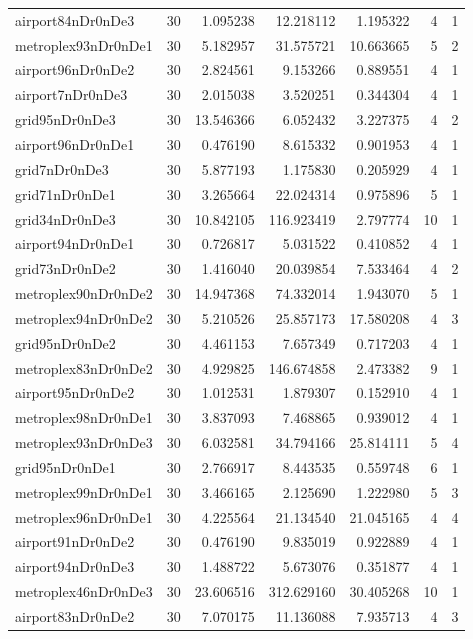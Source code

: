 \documentclass[../../../thesis.tex]{subfiles}
\begin{document}
\begin{longtable}{|l|r|r|r|r|r|r|}
airport84nDr0nDe3 & 30 & 1.095238 & 12.218112 & 1.195322 & 4 & 1 \\
metroplex93nDr0nDe1 & 30 & 5.182957 & 31.575721 & 10.663665 & 5 & 2 \\
airport96nDr0nDe2 & 30 & 2.824561 & 9.153266 & 0.889551 & 4 & 1 \\
airport7nDr0nDe3 & 30 & 2.015038 & 3.520251 & 0.344304 & 4 & 1 \\
grid95nDr0nDe3 & 30 & 13.546366 & 6.052432 & 3.227375 & 4 & 2 \\
airport96nDr0nDe1 & 30 & 0.476190 & 8.615332 & 0.901953 & 4 & 1 \\
grid7nDr0nDe3 & 30 & 5.877193 & 1.175830 & 0.205929 & 4 & 1 \\
grid71nDr0nDe1 & 30 & 3.265664 & 22.024314 & 0.975896 & 5 & 1 \\
grid34nDr0nDe3 & 30 & 10.842105 & 116.923419 & 2.797774 & 10 & 1 \\
airport94nDr0nDe1 & 30 & 0.726817 & 5.031522 & 0.410852 & 4 & 1 \\
grid73nDr0nDe2 & 30 & 1.416040 & 20.039854 & 7.533464 & 4 & 2 \\
metroplex90nDr0nDe2 & 30 & 14.947368 & 74.332014 & 1.943070 & 5 & 1 \\
metroplex94nDr0nDe2 & 30 & 5.210526 & 25.857173 & 17.580208 & 4 & 3 \\
grid95nDr0nDe2 & 30 & 4.461153 & 7.657349 & 0.717203 & 4 & 1 \\
metroplex83nDr0nDe2 & 30 & 4.929825 & 146.674858 & 2.473382 & 9 & 1 \\
airport95nDr0nDe2 & 30 & 1.012531 & 1.879307 & 0.152910 & 4 & 1 \\
metroplex98nDr0nDe1 & 30 & 3.837093 & 7.468865 & 0.939012 & 4 & 1 \\
metroplex93nDr0nDe3 & 30 & 6.032581 & 34.794166 & 25.814111 & 5 & 4 \\
grid95nDr0nDe1 & 30 & 2.766917 & 8.443535 & 0.559748 & 6 & 1 \\
metroplex99nDr0nDe1 & 30 & 3.466165 & 2.125690 & 1.222980 & 5 & 3 \\
metroplex96nDr0nDe1 & 30 & 4.225564 & 21.134540 & 21.045165 & 4 & 4 \\
airport91nDr0nDe2 & 30 & 0.476190 & 9.835019 & 0.922889 & 4 & 1 \\
airport94nDr0nDe3 & 30 & 1.488722 & 5.673076 & 0.351877 & 4 & 1 \\
metroplex46nDr0nDe3 & 30 & 23.606516 & 312.629160 & 30.405268 & 10 & 1 \\
airport83nDr0nDe2 & 30 & 7.070175 & 11.136088 & 7.935713 & 4 & 3 \\

\end{longtable}
\end{document}
